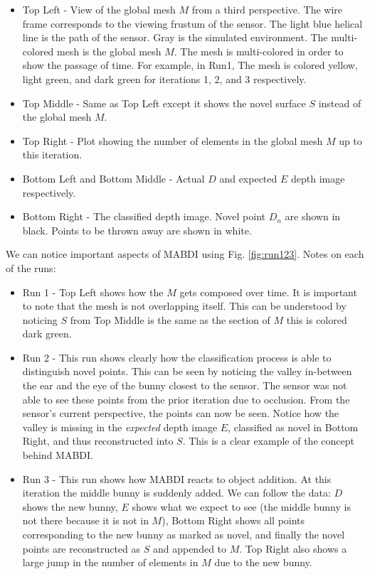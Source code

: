 \begin{itemize}
  \item Top Left - View of the global mesh $M$ from a third perspective. The
  wire frame corresponds to the viewing frustum of the sensor. The light blue
  helical line is the path of the sensor. Gray is the simulated environment.
  The multi-colored mesh is the global mesh $M$. The mesh is multi-colored in order
  to show the passage of time. For example, in Run1, The mesh is colored yellow,
  light green, and dark green for iterations 1, 2, and 3 respectively.
  \item Top Middle - Same as Top Left except it shows the novel surface $S$ instead of
  the global mesh $M$.
  \item Top Right - Plot showing the number of elements in the global mesh $M$
  up to this iteration.
  \item Bottom Left and Bottom Middle - Actual $D$ and expected $E$ depth image
  respectively.
  \item Bottom Right - The classified depth image. Novel point $D_n$ are shown
  in black. Points to be thrown away are shown in white.
\end{itemize}

We can notice important aspects of MABDI using Fig. \ref{fig:run123}. Notes on each of the runs:

\begin{itemize}
  \item Run 1 - Top Left shows how the $M$ gets composed over time.
  It is important to note that the mesh is not overlapping itself. This can be
  understood by noticing $S$ from Top Middle is the same as
  the section of $M$ this is colored dark green.
  \item Run 2 - This run shows clearly how the classification process is able to
  distinguish novel points. This can be seen by noticing the valley in-between
  the ear and the eye of the bunny closest to the sensor. The sensor was not
  able to see these points from the prior iteration due to occlusion. From the
  sensor's current perspective, the points can now be seen. Notice how the
  valley is missing in the \emph{expected} depth image $E$, classified as novel
  in Bottom Right, and thus reconstructed into $S$. This is a clear example of
  the concept behind MABDI.
  \item Run 3 - This run shows how MABDI reacts to object addition. At this
  iteration the middle bunny is suddenly added. We can follow the data: $D$
  shows the new bunny, $E$ shows what we expect to see (the middle bunny is not
  there because it is not in $M$), Bottom Right shows all points corresponding
  to the new bunny as marked as novel, and finally the novel points are
  reconstructed as $S$ and appended to $M$. Top Right also shows a large jump in
  the number of elements in $M$ due to the new bunny.
\end{itemize}

